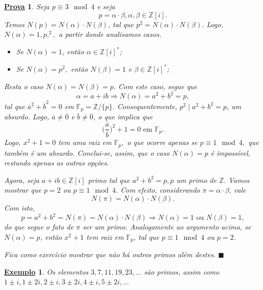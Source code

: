 \documentclass{article}
\newtheorem{example}{\underline{Exemplo}}
\newtheorem*{proof*}{\underline{Prova}}
\renewcommand\qedsymbol{$\blacksquare$}
\begin{document}
\begin{proof*}
  Seja \(p\equiv 3\mod 4\) e seja 
  \[
    p = \alpha \cdot \beta , \alpha , \beta \in \mathbb{Z}[i].
  \]
  Temos \(N(p) = N(\alpha )\cdot N(\beta )\), tal que \(p^{2} = N(\alpha )\cdot N(\beta )\). Logo,
 \(N(\alpha ) = 1, p, ^{2},\) a partir donde analisamos casos.
\begin{itemize}
  \item Se \(N(\alpha ) = 1\), então \(\alpha \in \mathbb{Z}[i]^{*}\);
  \item Se \(N(\alpha ) = p^{2},\) então \(N(\beta ) = 1\) e \(\beta \in \mathbb{Z}[i]^{*}\);
\end{itemize}
  Resta o caso \(N(\alpha ) = N(\beta ) = p.\) Com este caso, segue que 
  \[
    \alpha = a + ib \Rightarrow N(\alpha ) = a^{2} + b^{2} = p,
  \]
  tal que \(\overline{a}^{2} + \overline{b}^{2} = 0\) em \(\mathbb{F}_{p} = \mathbb{Z}/\{p\}\). Consequentemente,
 \(p^{2}\mid a^{2}+b^{2} = p\), um absurdo. Logo, \(\overline{a}\neq \overline{0}\) e \(\overline{b}\neq \overline{0}\), o que implica que 
  \[
    \biggl(\frac{\overline{a}}{\overline{b}}\biggr)^{2} + 1 = 0 \text{ em } \mathbb{F}_{p}.
  \]
  Logo, \(x^{2} + 1 = 0\) tem uma raiz em \(\mathbb{F}_{p},\) o que ocorre apenas se \(p\equiv 1 \mod 4,\) que também
é um absurdo. Conclui-se, assim, que o caso \(N(\alpha ) = p\) é impossível, restando apenas as outras opções.

  Agora, seja \(a+ib\in \mathbb{Z}[i]\) primo tal que \(a^{2} + b^{2} = p, p\) um primo de \(\mathbb{Z}.\)
Vamos mostrar que \(p = 2\) ou \(p\equiv 1\mod 4\). Com efeito, considerando \(\pi  = \alpha \cdot \beta \), vale 
  \[
    N(\pi ) = N(\alpha )\cdot N(\beta ).
  \]
  Com isto, 
  \[
    p = a^{2} + b^{2} = N(\pi) = N(\alpha )\cdot N(\beta ) \Rightarrow N(\alpha ) = 1 \text{ ou } N(\beta ) = 1,
  \]
do que segue o fato de \(\pi \) ser um primo. Analogamente ao argumento acima, se \(N(\alpha ) = p\), então \(x^{2} + 1\) tem raiz em \(\mathbb{F}_{p}\),
tal que \(p\equiv 1 \mod 4\) ou \(p = 2\).
  
  Fica como exercício mostrar que não há outros primos além destes. \qedsymbol
\end{proof*}
\begin{example}
  Os elementos \(3, 7, 11, 19, 23, \dotsc\) são primos, assim como \(1\pm i, 1\pm 2i, 2\pm i, 3\pm 2i, 4\pm i, 5\pm 2i, \dotsc\)
\end{example}
\newpage
\end{document}
